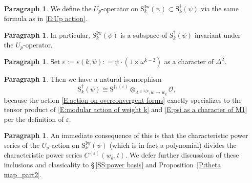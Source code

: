 \documentclass[12pt]{amsart}
\theoremstyle{definition}
\newtheorem{para}[subsection]{Paragraph}
\numberwithin{equation}{subsection}
\def\calO{\mathcal{O}}
\def\rmS{\mathrm{S}}
\newcommand{\Iw}{\mathrm{Iw}}
\newcommand{\Matrix}[4]{{\big(\begin{smallmatrix}#1&#2\\#3& #4\end{smallmatrix} \big)}}
\begin{document}
\begin{para}
\label{P:para_095}
We define the $U_p$-operator on $\rmS_{k}^{\Iw}(\psi) \subset \rmS_k^\dagger(\psi)$  via the same formula as in \eqref{E:Up action}.
\end{para}

\begin{para}
\label{P:para_096}
In particular, $\rmS_{k}^{\Iw}(\psi)$ is a subspace of $\rmS_k^\dagger(\psi)$ invariant under the $U_p$-operator.
\end{para}

\begin{para}
\label{P:para_097}
Set $\varepsilon:= \varepsilon(k,\psi): = \psi\cdot (1\times \omega^{k-2})$ as a character of $\Delta^2$.
\end{para}

\begin{para}
\label{P:para_098}
Then we have a natural isomorphism
\begin{equation}
\label{E:family overconvergent forms specialization}\rmS_k^{\dagger}(\psi)\cong
\rmS^{\dagger, (\varepsilon)} \otimes_{\Lambda^{\leq 1/p}, w \mapsto w_k} \calO,
\end{equation}
because  the action \eqref{E:action on overconvergent forms} exactly specializes to 
the tensor product of \eqref{E:modular action of weight k} and \eqref{E:psi as a character of M1} per the definition of $\varepsilon$.
\end{para}

\begin{para}
\label{P:para_099}
An immediate consequence of this is that the characteristic power series of the $U_p$-action on $\rmS_{k}^\Iw(\psi)$ (which is in fact a polynomial) divides the characteristic power series $C^{(\varepsilon)}(w_k, t)$.  We defer further discussions of these inclusions and classicality to  \S\,\ref{SS:power basis} and Proposition~\ref{P:theta map_part2}.
\end{para}
\end{document}
